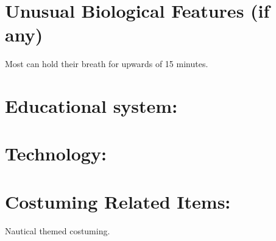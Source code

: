 \documentclass[blue]{GL2020}
\begin{document}
\section*{Unusual Biological Features (if any)}
Most \pShippies{} can hold their breath for upwards of 15 minutes.

\section{Educational system:}

\section{Technology:}

\section{Costuming Related Items:}
Nautical themed costuming.
\end{document}
